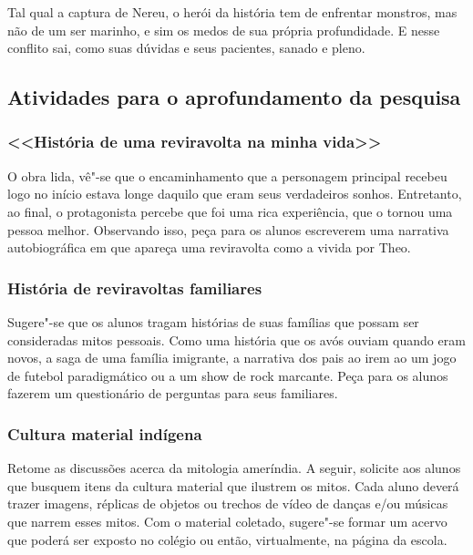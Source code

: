 \documentclass[12pt]{extarticle}
\begin{document}
Tal qual a captura de Nereu, o herói da história tem de enfrentar
monstros, mas não de um ser marinho, e sim os medos de sua
própria profundidade. E nesse conflito sai, como suas dúvidas e seus pacientes, sanado e pleno.







\subsection{Atividades para o aprofundamento da pesquisa}

\subsubsection{<<História de uma reviravolta na minha vida>>}

O obra lida, vê"-se que o encaminhamento que a personagem principal
  recebeu logo no início estava longe daquilo que eram seus verdadeiros
  sonhos. Entretanto, ao final, o protagonista percebe que foi uma rica
  experiência, que o tornou uma pessoa melhor. Observando isso, peça 
  para os alunos
  escreverem uma narrativa autobiográfica
  em que apareça uma reviravolta como a vivida
  por Theo.

\subsubsection{História de reviravoltas familiares}

Sugere"-se que os alunos tragam histórias de suas
  famílias que possam ser consideradas mitos pessoais. Como uma história
  que os avós ouviam quando eram novos, a saga de uma família imigrante,
  a narrativa dos pais ao irem ao um jogo de futebol paradigmático ou a
  um show de rock marcante. Peça para os alunos fazerem um questionário
  de perguntas para seus familiares.

\subsubsection{Cultura material indígena}
Retome as discussões acerca da mitologia ameríndia. A seguir,
  solicite aos alunos que busquem itens da cultura material que ilustrem
  os mitos. Cada aluno deverá trazer imagens, réplicas de objetos ou
  trechos de vídeo de danças e/ou músicas que narrem esses mitos. Com o
  material coletado, sugere"-se formar um acervo que poderá ser exposto
  no colégio ou então, virtualmente, na página da escola.
\end{document}
